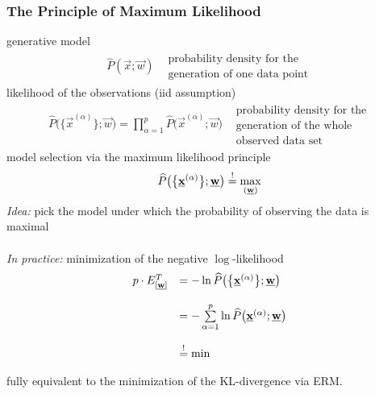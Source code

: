 \subsubsection{The Principle of Maximum Likelihood} \label{sec:ML}
generative model
\begin{equation}
        \begin{array}{lr}
        \widehat{P}(\vec{x};\vec{w}) 
        & \substack{ \text{probability density for the} \\
                   \text{generation of one data point} }
        \end{array}
\end{equation}
likelihood of the observations (iid assumption)
\begin{equation}
        \begin{array}{lr}
                \widehat{P}\big( \big\{ \vec{x}^{(\alpha)} \big\};\vec{w} \big)
                = \prod\limits_{\alpha = 1}^p \widehat{P}\big(\vec{x}^{(\alpha)}
                        ;\vec{w} \big)
                & \substack{    \text{probability density for the} \\
                                \text{generation of the whole} \\
                                \text{observed data set} }
        \end{array} 
\end{equation}
model selection via the maximum likelihood principle
\begin{equation}
        \widehat{P}\big(\big\{\underline{\mathbf{x}}^{(\alpha)}\big\};\underline{\mathbf{w}}\big)
                \stackrel{\mathrm{!}}{=} \max_{(\underline{\mathbf{w}})}
\end{equation}
\emph{Idea:} pick the model under which the probability of observing the data is maximal\\\\
\emph{In practice:} minimization of the negative $\log$-likelihood
\begin{equation}
        \begin{array}{ll}
                p \cdot E_{[\underline{\mathbf{w}}]}^T
                & = -\ln \widehat{P}\big(\big\{\underline{\mathbf{x}}^{(\alpha)}\big\}
                        ;\underline{\mathbf{w}}\big) \\\\
                & = -\sum\limits_{\alpha = 1}^p \ln \widehat{P}
                        \big( \underline{\mathbf{x}}^{(\alpha)};\underline{\mathbf{w}} \big) \\\\
                & \stackrel{\mathrm{!}}{=} \min
        \end{array}
\end{equation}
\begin{itemize}
        \itR fully equivalent to the minimization of the KL-divergence via ERM.
\end{itemize}

